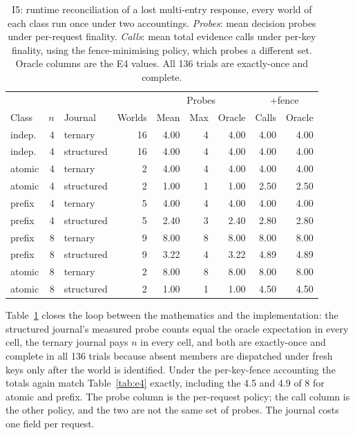 \documentclass[conference,10pt]{IEEEtran}
\begin{document}
\begin{table}[t]
\centering\footnotesize
\caption{I5: runtime reconciliation of a lost multi-entry response, every world of each class run once under two accountings. \emph{Probes}: mean decision probes under per-request finality. \emph{Calls}: mean total evidence calls under per-key finality, using the fence-minimising policy, which probes a different set. Oracle columns are the E4 values. All 136 trials are exactly-once and complete.}
\label{tab:i5}
\setlength{\tabcolsep}{2.5pt}
\begin{tabular}{@{}lrlrrrrrr@{}}
\toprule
 & & & & \multicolumn{3}{c}{Probes} & \multicolumn{2}{c}{+fence}\\
Class & $n$ & Journal & Worlds & Mean & Max & Oracle & Calls & Oracle\\
\midrule
indep. & 4 & ternary & 16 & 4.00 & 4 & 4.00 & 4.00 & 4.00\\
indep. & 4 & structured & 16 & 4.00 & 4 & 4.00 & 4.00 & 4.00\\
atomic & 4 & ternary & 2 & 4.00 & 4 & 4.00 & 4.00 & 4.00\\
atomic & 4 & structured & 2 & 1.00 & 1 & 1.00 & 2.50 & 2.50\\
prefix & 4 & ternary & 5 & 4.00 & 4 & 4.00 & 4.00 & 4.00\\
prefix & 4 & structured & 5 & 2.40 & 3 & 2.40 & 2.80 & 2.80\\
prefix & 8 & ternary & 9 & 8.00 & 8 & 8.00 & 8.00 & 8.00\\
prefix & 8 & structured & 9 & 3.22 & 4 & 3.22 & 4.89 & 4.89\\
atomic & 8 & ternary & 2 & 8.00 & 8 & 8.00 & 8.00 & 8.00\\
atomic & 8 & structured & 2 & 1.00 & 1 & 1.00 & 4.50 & 4.50\\
\bottomrule
\end{tabular}
\end{table}
Table~\ref{tab:i5} closes the loop between the mathematics and the implementation: the structured journal's measured probe counts equal the oracle expectation in every cell, the ternary journal pays $n$ in every cell, and both are exactly-once and complete in all 136 trials because absent members are dispatched under fresh keys only after the world is identified. Under the per-key-fence accounting the totals again match Table~\ref{tab:e4} exactly, including the 4.5 and 4.9 of 8 for atomic and prefix. The probe column is the per-request policy; the call column is the other policy, and the two are not the same set of probes. The journal costs one field per request.
\end{document}
